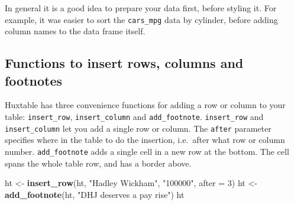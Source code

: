 \documentclass[]{article}
\newenvironment{Shaded}{\begin{snugshade}}{\end{snugshade}}
\newcommand{\KeywordTok}[1]{\textcolor[rgb]{0.13,0.29,0.53}{\textbf{#1}}}
\newcommand{\DataTypeTok}[1]{\textcolor[rgb]{0.13,0.29,0.53}{#1}}
\newcommand{\DecValTok}[1]{\textcolor[rgb]{0.00,0.00,0.81}{#1}}
\newcommand{\StringTok}[1]{\textcolor[rgb]{0.31,0.60,0.02}{#1}}
\newcommand{\NormalTok}[1]{#1}
\begin{document}
\FloatBarrier

In general it is a good idea to prepare your data first, before styling
it. For example, it was easier to sort the \texttt{cars\_mpg} data by
cylinder, before adding column names to the data frame itself.

\subsection{Functions to insert rows, columns and
footnotes}\label{functions-to-insert-rows-columns-and-footnotes}

Huxtable has three convenience functions for adding a row or column to
your table: \texttt{insert\_row}, \texttt{insert\_column} and
\texttt{add\_footnote}. \texttt{insert\_row} and \texttt{insert\_column}
let you add a single row or column. The \texttt{after} parameter
specifies where in the table to do the insertion, i.e.~after what row or
column number. \texttt{add\_footnote} adds a single cell in a new row at
the bottom. The cell spans the whole table row, and has a border above.

\begin{Shaded}
\begin{Highlighting}[]
\NormalTok{ht <-}\StringTok{ }\KeywordTok{insert_row}\NormalTok{(ht, }\StringTok{"Hadley Wickham"}\NormalTok{, }\StringTok{"100000"}\NormalTok{, }\DataTypeTok{after =} \DecValTok{3}\NormalTok{)}
\NormalTok{ht <-}\StringTok{ }\KeywordTok{add_footnote}\NormalTok{(ht, }\StringTok{"DHJ deserves a pay rise"}\NormalTok{)}
\NormalTok{ht}
\end{Highlighting}
\end{Shaded}
\end{document}
